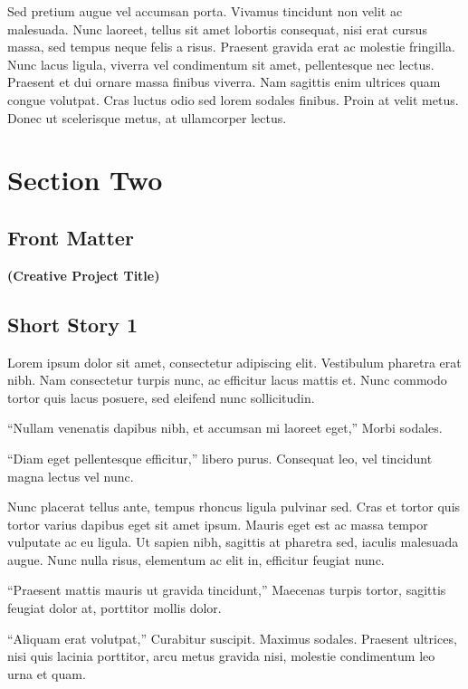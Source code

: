 \documentclass[a4paper]{memoir}
\begin{document}
Sed pretium augue vel accumsan porta. Vivamus tincidunt non velit ac malesuada. Nunc laoreet, tellus sit amet lobortis consequat, nisi erat cursus massa, sed tempus neque felis a risus. Praesent gravida erat ac molestie fringilla. Nunc lacus ligula, viverra vel condimentum sit amet, pellentesque nec lectus. Praesent et dui ornare massa finibus viverra. Nam sagittis enim ultrices quam congue volutpat. Cras luctus odio sed lorem sodales finibus. Proin at velit metus. Donec ut scelerisque metus, at ullamcorper lectus. 

\part{Section Two}
\label{sectiontwo}

\chapter{Front Matter}
\label{frontmatter}

\textbf{(Creative Project Title)}

\chapter{Short Story 1}
\label{shortstory1}

Lorem ipsum dolor sit amet, consectetur adipiscing elit. Vestibulum pharetra erat nibh. Nam consectetur turpis nunc, ac efficitur lacus mattis et. Nunc commodo tortor quis lacus posuere, sed eleifend nunc sollicitudin. 

“Nullam venenatis dapibus nibh, et accumsan mi laoreet eget,” Morbi sodales.

“Diam eget pellentesque efficitur,” libero purus. Consequat leo, vel tincidunt magna lectus vel nunc. 

Nunc placerat tellus ante, tempus rhoncus ligula pulvinar sed. Cras et tortor quis tortor varius dapibus eget sit amet ipsum. Mauris eget est ac massa tempor vulputate ac eu ligula. Ut sapien nibh, sagittis at pharetra sed, iaculis malesuada augue. Nunc nulla risus, elementum ac elit in, efficitur feugiat nunc. 

“Praesent mattis mauris ut gravida tincidunt,” Maecenas turpis tortor, sagittis feugiat dolor at, porttitor mollis dolor. 

“Aliquam erat volutpat,” Curabitur suscipit. Maximus sodales. Praesent ultrices, nisi quis lacinia porttitor, arcu metus gravida nisi, molestie condimentum leo urna et quam. 
\end{document}
